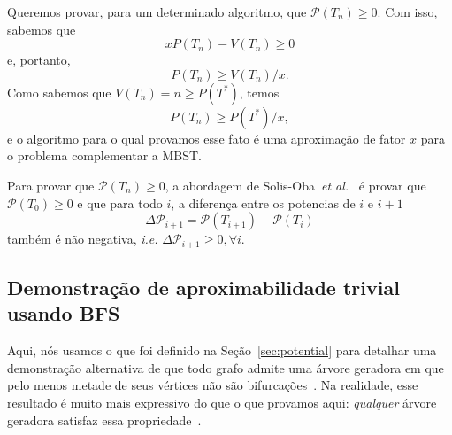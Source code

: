 \documentclass[conference]{IEEEtran}
\begin{document}
Queremos provar, para um determinado algoritmo, que $\mathcal{P}(T_n) \ge 0$. Com isso, sabemos que
\begin{equation}
   xP(T_n) - V(T_n) \ge 0
\end{equation}
e, portanto,
\begin{equation} \label{eq:tigher-bound}
  P(T_n) \ge V(T_n)/x.
\end{equation}
Como sabemos que $V(T_n) = n \ge P(T^*)$, temos
\begin{equation} \label{eq:pot-obj}
  P(T_n) \ge P(T^*)/x,
\end{equation}
e o algoritmo para o qual provamos esse fato \'e uma aproxima\c{c}\~ao de fator $x$ para o problema
complementar a MBST.

Para provar que $\mathcal{P}(T_n) \ge 0$, a abordagem de
Solis-Oba~\textit{et al.}~\cite{solis-oba2017} \'e provar que $\mathcal{P}(T_0) \ge 0$ e que para
todo $i$, a diferen\c{c}a entre os potencias de $i$ e $i+1$
\begin{equation}
  \Delta \mathcal{P}_{i + 1} = \mathcal{P}(T_{i + 1}) - \mathcal{P}(T_i)
\end{equation}
tamb\'em \'e n\~ao negativa, \textit{i.e.} $\Delta \mathcal{P}_{i + 1} \ge 0, \forall i$.

\subsection{Demonstra\c{c}\~ao de aproximabilidade trivial usando BFS}

Aqui, n\'os usamos o que foi definido na Se\c{c}\~ao~\ref{sec:potential} para detalhar uma
demonstra\c{c}\~ao alternativa de que todo grafo admite uma \'arvore geradora em que pelo menos
metade de seus v\'ertices n\~ao s\~ao bifurca\c{c}\~oes~\cite{chimani2015}.
Na realidade, esse resultado \'e muito mais expressivo do que o que provamos aqui: \emph{qualquer}
\'arvore geradora satisfaz essa propriedade~\cite{chimani2015}.
\end{document}
